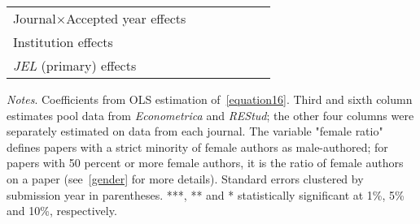 \begin{table}
\begin{threeparttable}
\begin{tabular}{p{3.78cm}S@{}S@{}S@{}S@{}S@{}S@{}}
            Journal\(\times\)Accepted year effects &               &               &           {}   &               &               &           {}   \\
            Institution effects           &           {}   &           {}   &           {}   &           {}   &           {}   &           {}   \\
            \textit{JEL} (primary) effects&               &               &               &           {}   &           {}   &           {}   \\
            \bottomrule
        \end{tabular}
        \begin{tablenotes}
            \tiny
            \item \textit{Notes}. Coefficients from OLS estimation of~\autoref{equation16}. Third and sixth column estimates pool data from \textit{Econometrica} and \textit{REStud}; the other four columns were separately estimated on data from each journal. The variable "female ratio" defines papers with a strict minority of female authors as male-authored; for papers with 50 percent or more female authors, it is the ratio of female authors on a paper (see~\autoref{gender} for more details). Standard errors clustered by submission year in parentheses. ***, ** and * statistically significant at 1\%, 5\% and 10\%, respectively.
        \end{tablenotes}
    \end{threeparttable}
\end{table}